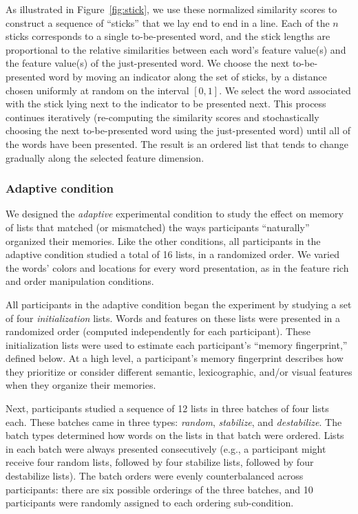 \documentclass[11pt]{article}
\begin{document}
As illustrated in Figure~\ref{fig:stick}, we use these normalized similarity
scores to construct a sequence of ``sticks'' that we lay end to end in a line.
Each of the $n$ sticks corresponds to a single to-be-presented word, and the
stick lengths are proportional to the relative similarities between each word's
feature value(s) and the feature value(s) of the just-presented word. We choose
the next to-be-presented word by moving an indicator along the set of sticks,
by a distance chosen uniformly at random on the interval $\left[0, 1\right]$.
We select the word associated with the stick lying next to the indicator to be
presented next. This process continues iteratively (re-computing the similarity
scores and stochastically choosing the next to-be-presented word using the
just-presented word) until all of the words have been presented. The result is
an ordered list that tends to change gradually along the selected feature
dimension.

\subsubsection*{Adaptive condition}

We designed the \textit{adaptive} experimental condition to study the effect on
memory of lists that matched (or mismatched) the ways participants
``naturally'' organized their memories. Like the other conditions, all
participants in the adaptive condition studied a total of 16 lists, in a
randomized order. We varied the words' colors and locations for every word
presentation, as in the feature rich and order manipulation conditions.

All participants in the adaptive condition began the experiment by studying a
set of four \textit{initialization} lists. Words and features on these lists
were presented in a randomized order (computed independently for each
participant). These initialization lists were used to estimate each
participant's ``memory fingerprint,'' defined below. At a high level, a
participant's memory fingerprint describes how they prioritize or consider
different semantic, lexicographic, and/or visual features when they organize
their memories.

Next, participants studied a sequence of 12 lists in three batches of four
lists each. These batches came in three types: \textit{random},
\textit{stabilize}, and \textit{destabilize}. The batch types determined how
words on the lists in that batch were ordered. Lists in each batch were always
presented consecutively (e.g., a participant might receive four random lists,
followed by four stabilize lists, followed by four destabilize lists). The
batch orders were evenly counterbalanced across participants: there are six
possible orderings of the three batches, and 10 participants were randomly
assigned to each ordering sub-condition.
\end{document}
